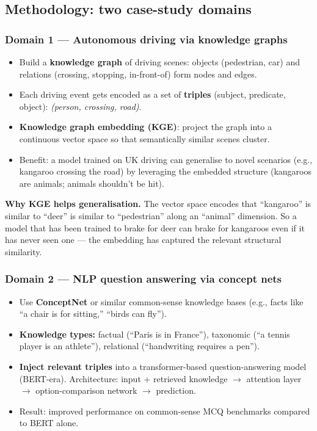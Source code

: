 \documentclass[11pt, a4paper]{article}
\begin{document}
\subsection{Methodology: two case-study domains}

\subsubsection*{Domain 1 — Autonomous driving via knowledge graphs}

\begin{itemize}
  \item Build a \textbf{knowledge graph} of driving scenes: objects (pedestrian, car) and relations (crossing, stopping, in-front-of) form nodes and edges.
  \item Each driving event gets encoded as a set of \textbf{triples} (subject, predicate, object): \emph{(person, crossing, road)}.
  \item \textbf{Knowledge graph embedding (KGE)}: project the graph into a continuous vector space so that semantically similar scenes cluster.
  \item Benefit: a model trained on UK driving can generalise to novel scenarios (e.g., kangaroo crossing the road) by leveraging the embedded structure (kangaroos are animals; animals shouldn't be hit).
\end{itemize}

\textbf{Why KGE helps generalisation.} The vector space encodes that ``kangaroo'' is similar to ``deer'' is similar to ``pedestrian'' along an ``animal'' dimension. So a model that has been trained to brake for deer can brake for kangaroos even if it has never seen one — the embedding has captured the relevant structural similarity.

\subsubsection*{Domain 2 — NLP question answering via concept nets}

\begin{itemize}
  \item Use \textbf{ConceptNet} or similar common-sense knowledge bases (e.g., facts like ``a chair is for sitting,'' ``birds can fly'').
  \item \textbf{Knowledge types:} factual (``Paris is in France''), taxonomic (``a tennis player is an athlete''), relational (``handwriting requires a pen'').
  \item \textbf{Inject relevant triples} into a transformer-based question-answering model (BERT-era). Architecture: input + retrieved knowledge $\to$ attention layer $\to$ option-comparison network $\to$ prediction.
  \item Result: improved performance on common-sense MCQ benchmarks compared to BERT alone.
\end{itemize}
\end{document}
